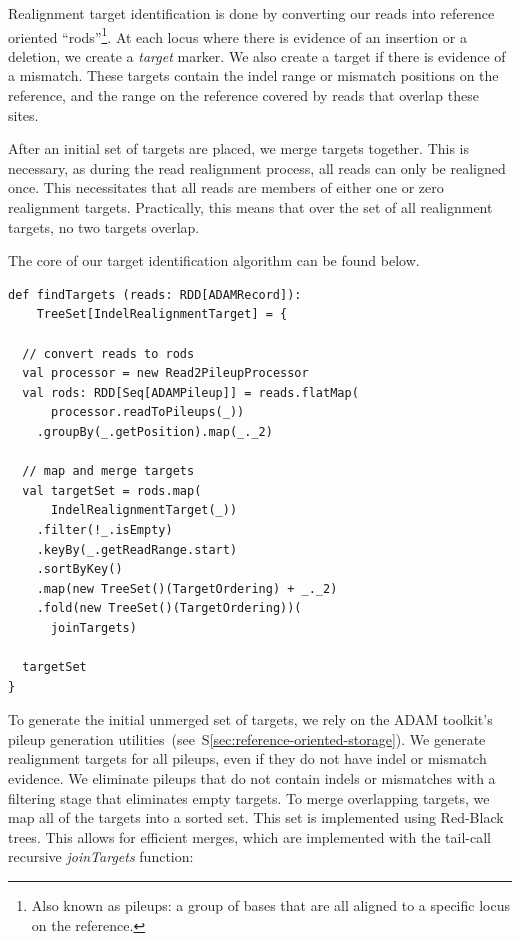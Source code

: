 \documentclass[10pt,twocolumn]{article}
\theoremstyle{plain}
\begin{document}
Realignment target identification is done by converting our reads into reference oriented ``rods''\footnote{Also known as pileups: a
group of bases that are all aligned to a specific locus on the reference.}. At each locus where there is evidence of an insertion or a
deletion, we create a \emph{target} marker. We also create a target if there is evidence of a mismatch. These targets contain the indel
range or mismatch positions on the reference, and the range on the reference covered by reads that overlap these sites.

After an initial set of targets are placed, we merge targets together. This is necessary, as during the read realignment process, all
reads can only be realigned once. This necessitates that all reads are members of either one or zero realignment targets. Practically,
this means that over the set of all realignment targets, no two targets overlap.

The core of our target identification algorithm can be found below.

\begin{lstlisting}
def findTargets (reads: RDD[ADAMRecord]):
    TreeSet[IndelRealignmentTarget] = {

  // convert reads to rods
  val processor = new Read2PileupProcessor
  val rods: RDD[Seq[ADAMPileup]] = reads.flatMap(
      processor.readToPileups(_))
    .groupBy(_.getPosition).map(_._2)

  // map and merge targets
  val targetSet = rods.map(
      IndelRealignmentTarget(_))
    .filter(!_.isEmpty)
    .keyBy(_.getReadRange.start)
    .sortByKey()
    .map(new TreeSet()(TargetOrdering) + _._2)
    .fold(new TreeSet()(TargetOrdering))(
      joinTargets)

  targetSet
}
\end{lstlisting}

To generate the initial unmerged set of targets, we rely on the ADAM toolkit's pileup generation utilities~(see~\-S\ref{sec:reference-oriented-storage}).
We generate realignment targets for all pileups, even if they do not have indel or mismatch evidence. We eliminate pileups that do not contain indels
or mismatches with a filtering stage that eliminates empty targets. To merge overlapping targets, we map all of the targets into a sorted set. This set
is implemented using Red-Black trees. This allows for efficient merges, which are implemented with the tail-call recursive \emph{joinTargets} function:
\end{document}

